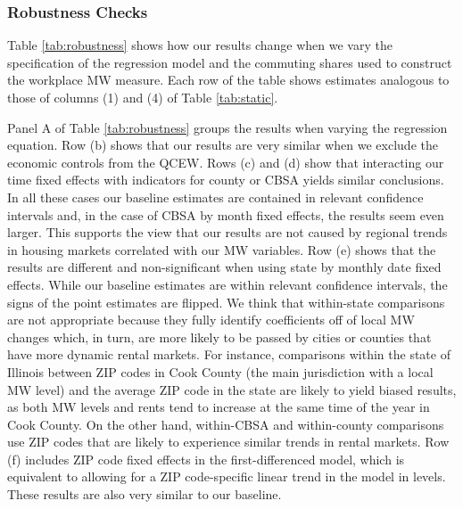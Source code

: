 \subsubsection*{Robustness Checks}

Table \ref{tab:robustness} shows how our results change when we vary the
specification of the regression model and the commuting shares used 
to construct the workplace MW measure.
Each row of the table shows estimates analogous to those of columns (1) and (4)
of Table \ref{tab:static}.

Panel A of Table \ref{tab:robustness} groups the results when varying the 
regression equation.
Row (b) shows that our results are very similar when we exclude the 
economic controls from the QCEW.
Rows (c) and (d) show that interacting our time fixed effects with indicators 
for county or CBSA yields similar conclusions.
In all these cases our baseline estimates are contained in relevant 
confidence intervals and, in the case of CBSA by month fixed effects, 
the results seem even larger.
This supports the view that our results are not caused by regional trends 
in housing markets correlated with our MW variables.
Row (e) shows that the results are different and non-significant when using 
state by monthly date fixed effects.
While our baseline estimates are within relevant confidence intervals, the 
signs of the point estimates are flipped.
We think that within-state comparisons are not appropriate because they fully 
identify coefficients off of local MW changes which, in turn, are more likely to 
be passed by cities or counties that have more dynamic rental markets.
For instance, comparisons within the state of Illinois between ZIP codes in 
Cook County (the main jurisdiction with a local MW level) and the average
ZIP code in the state are likely to yield biased results, as both MW levels and
rents tend to increase at the same time of the year in Cook County.
On the other hand, within-CBSA and within-county comparisons use ZIP codes that
are likely to experience similar trends in rental markets.
Row (f) includes ZIP code fixed effects in the first-differenced model, which
is equivalent to allowing for a ZIP code-specific linear trend in the model in 
levels.
These results are also very similar to our baseline.
%
%

